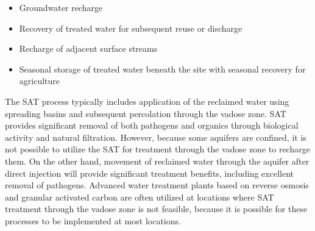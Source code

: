 \begin{itemize}
\item Groundwater recharge
\item Recovery of treated water for subsequent reuse or discharge
\item Recharge of adjacent surface streams
\item Seasonal storage of treated water beneath the site with seasonal recovery for agriculture
\end{itemize}
The SAT process typically includes application of the reclaimed water using spreading basins and subsequent percolation through the vadose zone. SAT provides significant removal of both pathogens and organics through biological activity and natural filtration. However, because some aquifers are confined, it is not possible to utilize the SAT for treatment through the vadose zone to recharge them. On the other hand, movement of reclaimed water through the aquifer after direct injection will provide significant treatment benefits, including excellent removal of pathogens. Advanced water treatment plants based on reverse osmosis and granular activated carbon are often utilized at locations where SAT treatment through the vadose zone is not feasible, because it is possible for these processes to be implemented at most locations.\\

